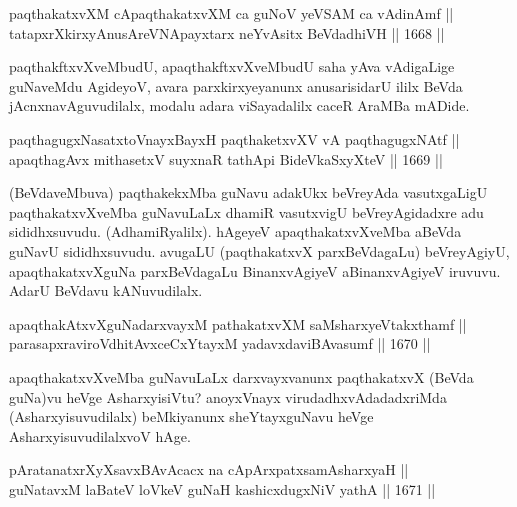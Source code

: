 
\begin{shl}
paqthakatxvXM cApaqthakatxvXM ca guNoV yeVSAM ca vAdinAmf ||  \\
tatapxrXkirxyAnusAreVNApayxtarx neYvAsitx BeVdadhiVH ||  1668 ||  
\end{shl}

\begin{artha}
paqthakftxvXveMbudU, apaqthakftxvXveMbudU saha yAva vAdigaLige guNaveMdu AgideyoV, avara parxkirxyeyanunx anusarisidarU ililx BeVda jAcnxnavAguvudilalx, modalu adara viSayadalilx caceR AraMBa mADide.
\end{artha}

\begin{shl}
paqthagugxNasatxtoV\s nayxBayxH paqthaketxvXV vA paqthagugxNAtf ||  \\
apaqthagAvx mithasetxV suyxnaR tathA\s pi BideVkaSxyXteV ||  1669 ||  
\end{shl}

\begin{artha}
(BeVdaveMbuva) paqthakekxMba guNavu adakUkx beVreyAda vasutxgaLigU paqthakatxvXveMba guNavuLaLx dhamiR vasutxvigU beVreyAgidadxre adu sididhxsuvudu. (AdhamiRyalilx). hAgeyeV apaqthakatxvXveMba aBeVda guNavU sididhxsuvudu. avugaLU (paqthakatxvX parxBeVdagaLu) beVreyAgiyU, apaqthakatxvXguNa parxBeVdagaLu BinanxvAgiyeV aBinanxvAgiyeV iruvuvu. AdarU BeVdavu kANuvudilalx.
\end{artha}

\begin{shl}
apaqthakAtxvXguNadarxvayxM pathakatxvXM saMsharxyeVtakxthamf ||  \\
parasapxraviroVdhitAvxceCxYtayxM yadavxdaviBAvasumf ||  1670 ||  
\end{shl}

\begin{artha}
apaqthakatxvXveMba guNavuLaLx darxvayxvanunx paqthakatxvX (BeVda guNa)vu heVge AsharxyisiVtu?  anoyxVnayx virudadhxvAdadadxriMda (Asharxyisuvudilalx) beMkiyanunx sheYtayxguNavu heVge AsharxyisuvudilalxvoV hAge.
\end{artha}


\begin{shl}
pAratanatxrXyXsavxBAvAcacx na cApArxpatxsamAsharxyaH || \\
guNatavxM laBateV loVkeV guNaH kashicxdugxNiV yathA ||  1671 ||  
\end{shl}

